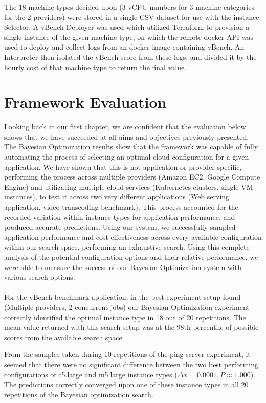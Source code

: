 \documentclass{report}
\begin{document}
The 18 machine types decided upon (3 vCPU numbers for 3 machine categories for the 2 providers) were stored in a single CSV dataset for use with the instance Selector. A vBench Deployer was used which utilized Terraform to provision a single instance of the given machine type, on which the remote docker API was used to deploy and collect logs from an docker image containing vBench. An Interpreter then isolated the vBench score from these logs, and divided it by the hourly cost of that machine type to return the final value.

\section{Framework Evaluation}
Looking back at our first chapter, we are confident that the evaluation below shows that we have succeeded at all aims and objectives previously presented. The Bayesian Optimization results show that the framework was capable of fully automating the process of selecting an optimal cloud configuration for a given application. We have shown that this is not application or provider specific, performing the process across multiple providers (Amazon EC2, Google Compute Engine) and utilizating multiple cloud services (Kubernetes clusters, single VM instances), to test it across two very different applications (Web serving application, video transcoding benchmark). This process accounted for the recorded variation within instance types for application performance, and produced accurate predictions. Using our system, we successfully sampled application performance and cost-effectiveness across every available configuration within our search space, performing an exhaustive search. Using this complete analysis of the potential configuration options and their relative performance, we were able to measure the success of our Bayesian Optimization system with various search options.

\paragraph{}

For the vBench benchmark application, in the best experiment setup found (Multiple providers, 2 concurrent jobs) our Bayesian Optimization experiment correctly identified the optimal instance type in 18 out of 20 repetitions. The mean value returned with this search setup was at the 98th percentile of possible scores from the available search space.

From the samples taken during 10 repetitions of the ping server experiment, it seemed that there were no significant difference between the two best performing configurations of c5.large and m5.large instance types ($\Delta \bar{x}=0.0001, P \approx 1.000$). The predictions correctly converged upon one of these instance types in all 20 repetitions of the Bayesian optimization search.
\end{document}
